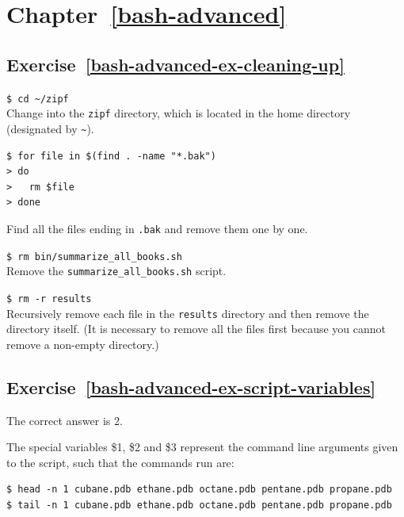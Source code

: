 \documentclass[
]{krantz}
\begin{document}
\hypertarget{chapter-refbash-advanced}{%
\section*{Chapter~\ref{bash-advanced}}\label{chapter-refbash-advanced}}

\hypertarget{exercise-refbash-advanced-ex-cleaning-up}{%
\subsection*{Exercise~\ref{bash-advanced-ex-cleaning-up}}\label{exercise-refbash-advanced-ex-cleaning-up}}


\texttt{\$\ cd\ \textasciitilde{}/zipf}~\\
Change into the \texttt{zipf} directory,
which is located in the home directory (designated by \texttt{\textasciitilde{}}).

\begin{verbatim}
$ for file in $(find . -name "*.bak")
> do
>   rm $file
> done
\end{verbatim}

Find all the files ending in \texttt{.bak} and remove them one by one.

\texttt{\$\ rm\ bin/summarize\_all\_books.sh}~\\
Remove the \texttt{summarize\_all\_books.sh} script.

\texttt{\$\ rm\ -r\ results}~\\
Recursively remove each file in the \texttt{results} directory
and then remove the directory itself.
(It is necessary to remove all the files first because you
cannot remove a non-empty directory.)

\hypertarget{exercise-refbash-advanced-ex-script-variables}{%
\subsection*{Exercise~\ref{bash-advanced-ex-script-variables}}\label{exercise-refbash-advanced-ex-script-variables}}


The correct answer is 2.

The special variables \$1, \$2 and \$3 represent the command line arguments given to the
script, such that the commands run are:

\begin{verbatim}
$ head -n 1 cubane.pdb ethane.pdb octane.pdb pentane.pdb propane.pdb
$ tail -n 1 cubane.pdb ethane.pdb octane.pdb pentane.pdb propane.pdb
\end{verbatim}
\end{document}
